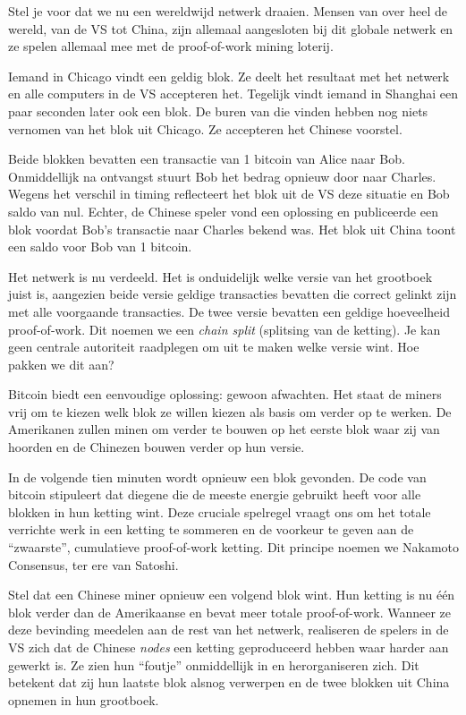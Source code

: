 \documentclass[smalldemyvopaper,11pt,twoside,onecolumn,openright,extrafontsizes]{memoir}
\begin{document}
Stel je voor dat we nu een wereldwijd netwerk draaien. Mensen van over heel de wereld, van de VS tot China, zijn allemaal aangesloten bij dit globale netwerk en ze spelen allemaal mee met de proof-of-work mining loterij.

Iemand in Chicago vindt een geldig blok. Ze deelt het resultaat met het netwerk en alle computers in de VS accepteren het. Tegelijk vindt iemand in Shanghai een paar seconden later ook een blok. De buren van die vinden hebben nog niets vernomen van het blok uit Chicago. Ze accepteren het Chinese voorstel.

Beide blokken bevatten een transactie van 1 bitcoin van Alice naar Bob. Onmiddellijk na ontvangst stuurt Bob het bedrag opnieuw door naar Charles. Wegens het verschil in timing reflecteert het blok uit de VS deze situatie en Bob saldo van nul. Echter, de Chinese speler vond een oplossing en publiceerde een blok voordat Bob’s transactie naar Charles bekend was. Het blok uit China toont een saldo voor Bob van 1 bitcoin.

Het netwerk is nu verdeeld. Het is onduidelijk welke versie van het grootboek juist is, aangezien beide versie geldige transacties bevatten die correct gelinkt zijn met alle voorgaande transacties. De twee versie bevatten een geldige hoeveelheid proof-of-work. Dit noemen we een \textit{chain split} (splitsing van de ketting). Je kan geen centrale autoriteit raadplegen om uit te maken welke versie wint. Hoe pakken we dit aan?

Bitcoin biedt een eenvoudige oplossing: gewoon afwachten. Het staat de miners vrij om te kiezen welk blok ze willen kiezen als basis om verder op te werken. De Amerikanen zullen minen om verder te bouwen op het eerste blok waar zij van hoorden en de Chinezen bouwen verder op hun versie.

In de volgende tien minuten wordt opnieuw een blok gevonden. De code van bitcoin stipuleert dat diegene die de meeste energie gebruikt heeft voor alle blokken in hun ketting wint. Deze cruciale spelregel vraagt ons om het totale verrichte werk in een ketting te sommeren en de voorkeur te geven aan de “zwaarste”, cumulatieve proof-of-work ketting. Dit principe noemen we Nakamoto Consensus, ter ere van Satoshi.

Stel dat een Chinese miner opnieuw een volgend blok wint. Hun ketting is nu één blok verder dan de Amerikaanse en bevat meer totale proof-of-work. Wanneer ze deze bevinding meedelen aan de rest van het netwerk, realiseren de spelers in de VS zich dat de Chinese \textit{nodes} een ketting geproduceerd hebben waar harder aan gewerkt is. Ze zien hun “foutje” onmiddellijk in en herorganiseren zich. Dit betekent dat zij hun laatste blok alsnog verwerpen en de twee blokken uit China opnemen in hun grootboek.
\end{document}
